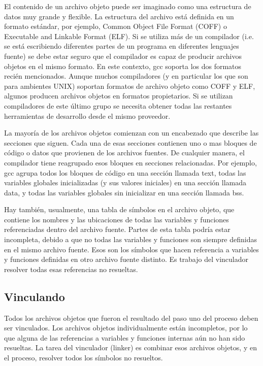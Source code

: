 \documentclass[12pt]{article}
\begin{document}
El contenido de un archivo objeto puede ser imaginado como una estructura de datos
muy grande y flexible. La estructura del archivo está definida en un formato estándar, 
por ejemplo, Common Object File Format (COFF) o Executable and Linkable Format (ELF).
Si se utiliza más de un compilador (i.e. se está escribiendo diferentes partes de un programa
en diferentes lenguajes fuente) se debe estar seguro que el compilador es capaz
de producir archivos objetos en el mismo formato. En este contexto, gcc soporta 
los dos formatos recién mencionados. Aunque muchos compiladores (y en particular
los que son para ambientes UNIX) soportan formatos de archivo objeto como
COFF y ELF, algunos producen archivos objetos en formatos propietarios.
Si se utilizan compiladores de este último grupo se necesita obtener todas
las restantes herramientas de desarrollo desde el mismo proveedor.


La mayoría de los archivos objetos comienzan con un encabezado que describe las secciones
que siguen. Cada una de esas secciones contienen uno o mas bloques de código o datos que 
provienen de los archivos fuentes. De cualquier manera, el compilador tiene reagrupado
esos bloques en secciones relacionadas. Por ejemplo, gcc agrupa todos los bloques de
código en una sección llamada text, todas las variables globales inicializadas (y sus
valores iniciales) en una sección llamada data, y todas las variables globales sin 
inicializar en una sección llamada bss.

Hay también, usualmente, una tabla de símbolos en el archivo objeto, que contiene
los nombres y las ubicaciones de todas las variables y funciones referenciadas dentro
del archivo fuente. Partes de esta tabla podría estar incompleta, debido a que
no todas las variables y funciones son siempre definidas en el mismo archivo fuente. 
Esos son los símbolos que hacen referencia a variables y funciones definidas en 
otro archivo fuente distinto. Es trabajo del vinculador resolver todas esas referencias
no resueltas.

\subsection *{Vinculando}

Todos los archivos objetos que fueron el resultado del paso uno del proceso deben
ser vinculados. Los archivos objetos individualmente están incompletos, por lo que
alguna de las referencias a variables y funciones internas aún no han sido resueltas.
La tarea del vinculador (linker) es combinar esos archivos objetos, y en el proceso,
resolver todos los símbolos no resueltos.
\end{document}

